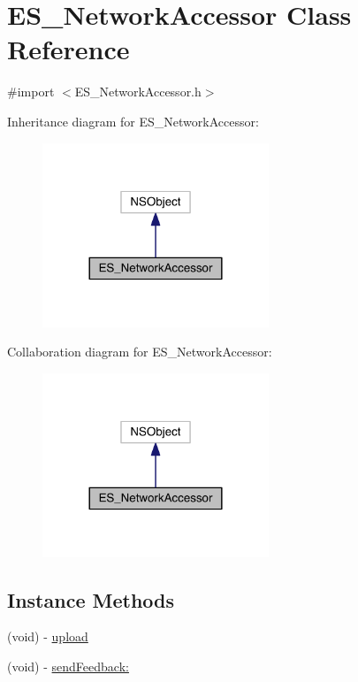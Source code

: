 \hypertarget{interface_e_s___network_accessor}{\section{E\+S\+\_\+\+Network\+Accessor Class Reference}
\label{interface_e_s___network_accessor}
}


{\ttfamily \#import $<$E\+S\+\_\+\+Network\+Accessor.\+h$>$}



Inheritance diagram for E\+S\+\_\+\+Network\+Accessor\+:\nopagebreak
\begin{figure}[H]
\begin{center}
\leavevmode
\includegraphics[width=192pt]{da/d94/interface_e_s___network_accessor__inherit__graph}
\end{center}
\end{figure}


Collaboration diagram for E\+S\+\_\+\+Network\+Accessor\+:\nopagebreak
\begin{figure}[H]
\begin{center}
\leavevmode
\includegraphics[width=192pt]{db/dab/interface_e_s___network_accessor__coll__graph}
\end{center}
\end{figure}
\subsection*{Instance Methods}
\begin{DoxyCompactItemize}
\item 
(void) -\/ \hyperlink{interface_e_s___network_accessor_aaa340abbb8c740c9485077bd6195a619}{upload}
\item 
(void) -\/ \hyperlink{interface_e_s___network_accessor_a6df976079e59e422cc74ed9fa3f224ba}{send\+Feedback\+:}
\end{DoxyCompactItemize}
